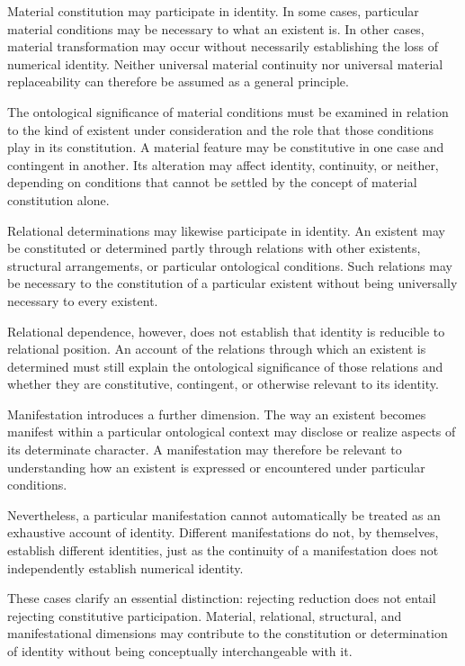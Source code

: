 Material constitution may participate in identity. In some
cases, particular material conditions may be necessary to
what an existent is. In other cases, material transformation
may occur without necessarily establishing the loss of
numerical identity. Neither universal material continuity
nor universal material replaceability can therefore be
assumed as a general principle.

The ontological significance of material conditions must
be examined in relation to the kind of existent under
consideration and the role that those conditions play in
its constitution. A material feature may be constitutive
in one case and contingent in another. Its alteration may
affect identity, continuity, or neither, depending on
conditions that cannot be settled by the concept of
material constitution alone.

Relational determinations may likewise participate in
identity. An existent may be constituted or determined
partly through relations with other existents, structural
arrangements, or particular ontological conditions. Such
relations may be necessary to the constitution of a
particular existent without being universally necessary
to every existent.

Relational dependence, however, does not establish that
identity is reducible to relational position. An account
of the relations through which an existent is determined
must still explain the ontological significance of those
relations and whether they are constitutive, contingent,
or otherwise relevant to its identity.

Manifestation introduces a further dimension. The way an
existent becomes manifest within a particular ontological
context may disclose or realize aspects of its determinate
character. A manifestation may therefore be relevant to
understanding how an existent is expressed or encountered
under particular conditions.

Nevertheless, a particular manifestation cannot
automatically be treated as an exhaustive account of
identity. Different manifestations do not, by themselves,
establish different identities, just as the continuity
of a manifestation does not independently establish
numerical identity.

These cases clarify an essential distinction: rejecting
reduction does not entail rejecting constitutive
participation. Material, relational, structural, and
manifestational dimensions may contribute to the constitution
or determination of identity without being conceptually
interchangeable with it.

